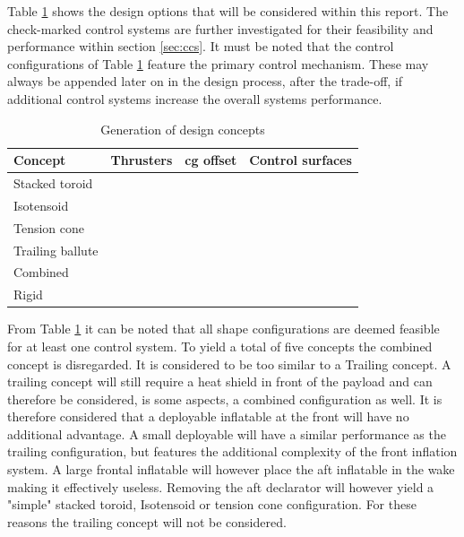 Table \ref{tab:designconcepts} shows the design options that will be considered within this report. The check-marked control systems are further investigated for their feasibility and performance within section \ref{sec:ccs}. It must be noted that the control configurations of Table \ref{tab:designconcepts} feature the primary control mechanism. These may always be appended later on in the design process, after the trade-off, if additional control systems increase the overall systems performance. 

\begin{table}[H]
	\caption{Generation of design concepts}
	\label{tab:designconcepts}
	\centering
		\begin{tabular}{|p{}|p{}|p{}|p{}|} \hline 
			\textbf{Concept} & \textbf{Thrusters}	& \textbf{\gls{cg} offset} &  \textbf{Control surfaces} \\ \hline \hline
			Stacked toroid   & \cmark	& \cmark &  \cmark \\ \hline
			Isotensoid		 & \cmark	& \cmark &  \xmark\\  \hline
			Tension cone	 & \cmark	& \cmark &  \cmark \\ \hline
			Trailing ballute & \xmark	& \xmark &  \cmark \\ \hline
			Combined 		 & \xmark	& \xmark &  \cmark \\ \hline
			Rigid  		   	 & \cmark	& \cmark &  \cmark \\ \hline
		\end{tabular}
\end{table}

From Table \ref{tab:designconcepts} it can be noted that all shape configurations are deemed feasible for at least one control system. To yield a total of five concepts the combined concept is disregarded.
 It is considered to be too similar to a Trailing concept. A trailing concept will still require a heat shield in front of the payload and can therefore be considered, is some aspects, a combined configuration as well. It is therefore considered that a deployable inflatable at the front will have no additional advantage. A small deployable will have a similar performance as the trailing configuration, but features the additional complexity of the front inflation system. A large frontal inflatable will however place the aft inflatable in the wake making it effectively useless. Removing the aft declarator will however yield a "simple" stacked toroid, Isotensoid or tension cone configuration. For these reasons the trailing concept will not be considered. 
 
